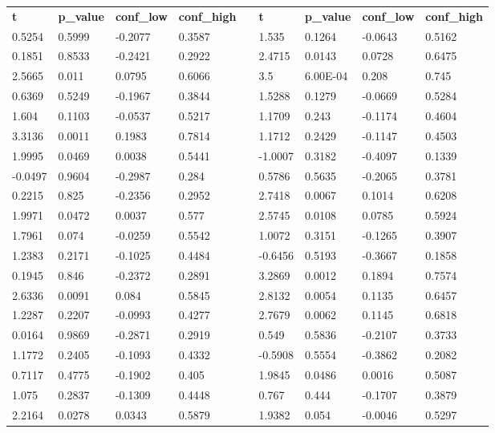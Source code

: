 \begin{table}[h!]
\small
\begin{tabular}{lllllllll}
\textbf{t} & \textbf{p\_value} & \textbf{conf\_low} & \textbf{conf\_high} & \textbf{} & \textbf{t} & \textbf{p\_value} & \textbf{conf\_low} & \textbf{conf\_high} \\ \cline{1-4} \cline{6-9} 
0.5254 & 0.5999 & -0.2077 & 0.3587 &  & 1.535 & 0.1264 & -0.0643 & 0.5162 \\
0.1851 & 0.8533 & -0.2421 & 0.2922 &  & 2.4715 & 0.0143 & 0.0728 & 0.6475 \\
2.5665 & 0.011 & 0.0795 & 0.6066 &  & 3.5 & 6.00E-04 & 0.208 & 0.745 \\
0.6369 & 0.5249 & -0.1967 & 0.3844 &  & 1.5288 & 0.1279 & -0.0669 & 0.5284 \\
1.604 & 0.1103 & -0.0537 & 0.5217 &  & 1.1709 & 0.243 & -0.1174 & 0.4604 \\
3.3136 & 0.0011 & 0.1983 & 0.7814 &  & 1.1712 & 0.2429 & -0.1147 & 0.4503 \\
1.9995 & 0.0469 & 0.0038 & 0.5441 &  & -1.0007 & 0.3182 & -0.4097 & 0.1339 \\
-0.0497 & 0.9604 & -0.2987 & 0.284 &  & 0.5786 & 0.5635 & -0.2065 & 0.3781 \\
0.2215 & 0.825 & -0.2356 & 0.2952 &  & 2.7418 & 0.0067 & 0.1014 & 0.6208 \\
1.9971 & 0.0472 & 0.0037 & 0.577 &  & 2.5745 & 0.0108 & 0.0785 & 0.5924 \\
1.7961 & 0.074 & -0.0259 & 0.5542 &  & 1.0072 & 0.3151 & -0.1265 & 0.3907 \\
1.2383 & 0.2171 & -0.1025 & 0.4484 &  & -0.6456 & 0.5193 & -0.3667 & 0.1858 \\
0.1945 & 0.846 & -0.2372 & 0.2891 &  & 3.2869 & 0.0012 & 0.1894 & 0.7574 \\
2.6336 & 0.0091 & 0.084 & 0.5845 &  & 2.8132 & 0.0054 & 0.1135 & 0.6457 \\
1.2287 & 0.2207 & -0.0993 & 0.4277 &  & 2.7679 & 0.0062 & 0.1145 & 0.6818 \\
0.0164 & 0.9869 & -0.2871 & 0.2919 &  & 0.549 & 0.5836 & -0.2107 & 0.3733 \\
1.1772 & 0.2405 & -0.1093 & 0.4332 &  & -0.5908 & 0.5554 & -0.3862 & 0.2082 \\
0.7117 & 0.4775 & -0.1902 & 0.405 &  & 1.9845 & 0.0486 & 0.0016 & 0.5087 \\
1.075 & 0.2837 & -0.1309 & 0.4448 &  & 0.767 & 0.444 & -0.1707 & 0.3879 \\
2.2164 & 0.0278 & 0.0343 & 0.5879 &  & 1.9382 & 0.054 & -0.0046 & 0.5297 \\

\end{tabular}
\end{table}

